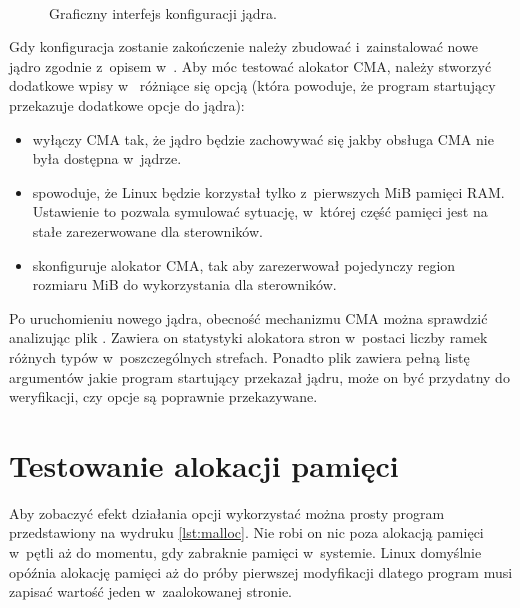 \begin{figure}[tbp]
  \centering
   \\
  \caption{Graficzny interfejs konfiguracji jądra.}
  \label{fig:xconfig}
\end{figure}

Gdy konfiguracja zostanie zakończenie należy zbudować i~zainstalować
nowe jądro zgodnie z~opisem w~\autocite{bib:building-linux}.  Aby móc
testować alokator CMA, należy stworzyć dodatkowe wpisy
w~ różniące się opcją  (która
powoduje, że program startujący przekazuje dodatkowe opcje do jądra):

\begin{itemize}
\item {} wyłączy CMA tak, że jądro będzie
  zachowywać się jakby obsługa CMA nie była dostępna w~jądrze.
\item {} spowoduje, że Linux będzie
  korzystał tylko z~pierwszych \unit[512]{MiB} pamięci RAM.  Ustawienie
  to pozwala symulować sytuację, w~której część pamięci jest na stałe
  zarezerwowane dla sterowników.
\item {} skonfiguruje alokator CMA, tak aby
  zarezerwował pojedynczy region rozmiaru \unit[512]{MiB} do
  wykorzystania dla sterowników.
\end{itemize}

Po uruchomieniu nowego jądra, obecność mechanizmu CMA można sprawdzić
analizując plik .  Zawiera on statystyki
alokatora stron w~postaci liczby ramek różnych typów w~poszczególnych
strefach.  Ponadto plik  zawiera pełną listę
argumentów jakie program startujący przekazał jądru, może on być
przydatny do weryfikacji, czy opcje są poprawnie przekazywane.


\section{Testowanie alokacji pamięci}

Aby zobaczyć efekt działania opcji  wykorzystać można prosty
program  przedstawiony na wydruku \ref{lst:malloc}.  Nie
robi on nic poza alokacją pamięci w~pętli aż do momentu, gdy zabraknie
pamięci w~systemie.  Linux domyślnie opóźnia alokację pamięci aż do
próby pierwszej modyfikacji dlatego program musi zapisać wartość jeden
w~zaalokowanej stronie.

